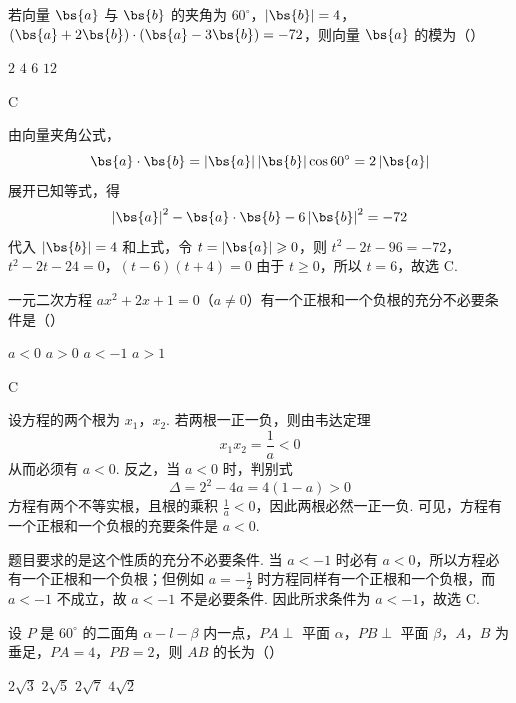 \begin{problem}
若向量 \(\bs{a}\) 与 \(\bs{b}\) 的夹角为 \(60^{\circ}\)，\(\left|\bs{b}\right|=4\)，\(\left(\bs{a}+2\bs{b}\right)\cdot\left(\bs{a}-3\bs{b}\right)=-72\)，则向量 \(\bs{a}\) 的模为（\quad）

\choices
    {\(2\)}
    {\(4\)}
    {\(6\)}
    {\(12\)}
\end{problem}

\begin{answer}
C
\end{answer}

\begin{solution}
由向量夹角公式，
\[
\bs{a}\cdot\bs{b}=\left|\bs{a}\right|\left|\bs{b}\right|\cos60^{\circ}=2\left|\bs{a}\right|\]
展开已知等式，得
\[
\left|\bs{a}\right|^2-\bs{a}\cdot\bs{b}-6\left|\bs{b}\right|^2=-72\]
代入 \(\left|\bs{b}\right|=4\) 和上式，令 \(t=\left|\bs{a}\right|\geqslant0\)，则
\(t^2-2t-96=-72\)，\(t^2-2t-24=0\)，\(\left(t-6\right)\left(t+4\right)=0\)
由于 \(t\geqslant0\)，所以 \(t=6\)，故选 C.
\end{solution}

\begin{problem}
一元二次方程 \(ax^2+2x+1=0\)（\(a\neq0\)）有一个正根和一个负根的充分不必要条件是（\quad）

\choices
    {\(a<0\)}
    {\(a>0\)}
    {\(a<-1\)}
    {\(a>1\)}
\end{problem}

\begin{answer}
C
\end{answer}

\begin{solution}
设方程的两个根为 \(x_1\)，\(x_2\). 若两根一正一负，则由韦达定理
\[
x_1x_2=\frac{1}{a}<0
\]
从而必须有 \(a<0\). 反之，当 \(a<0\) 时，判别式
\[
\Delta=2^2-4a=4(1-a)>0
\]
方程有两个不等实根，且根的乘积 \(\frac{1}{a}<0\)，因此两根必然一正一负. 可见，方程有一个正根和一个负根的充要条件是 \(a<0\).

题目要求的是这个性质的充分不必要条件. 当 \(a<-1\) 时必有 \(a<0\)，所以方程必有一个正根和一个负根；但例如 \(a=-\frac{1}{2}\) 时方程同样有一个正根和一个负根，而 \(a<-1\) 不成立，故 \(a<-1\) 不是必要条件. 因此所求条件为 \(a<-1\)，故选 C.
\end{solution}

\begin{problem}
设 \(P\) 是 \(60^{\circ}\) 的二面角 \(\alpha-l-\beta\) 内一点，\(PA\perp\) 平面 \(\alpha\)，\(PB\perp\) 平面 \(\beta\)，\(A\)，\(B\) 为垂足，\(PA=4\)，\(PB=2\)，则 \(AB\) 的长为（\quad）

\choices
    {\(2\sqrt{3}\)}
    {\(2\sqrt{5}\)}
    {\(2\sqrt{7}\)}
    {\(4\sqrt{2}\)}
\end{problem}

